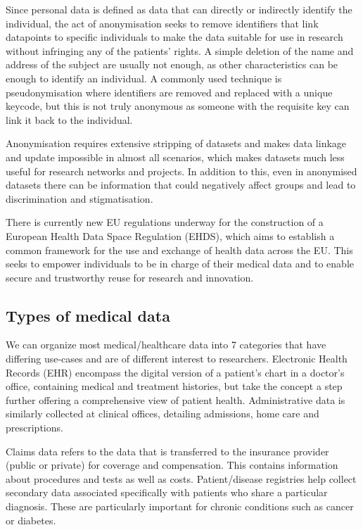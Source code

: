 	Since personal data is defined as data that can directly or indirectly identify the individual\cite{personal}, the act of anonymisation seeks to remove identifiers that link datapoints to specific individuals to make the data suitable for use in research without infringing any of the patients' rights. A simple deletion of the name and address of the subject are usually not enough, as other characteristics can be enough to identify an individual. A commonly used technique is pseudonymisation where identifiers are removed and replaced with a unique keycode, but this is not truly anonymous as someone with the requisite key can link it back to the individual\cite{dataprot}. 
	
	Anonymisation requires extensive stripping of datasets and makes data linkage and update impossible in almost all scenarios, which makes datasets much less useful for research networks and projects. In addition to this, even in anonymised datasets there can be information that could negatively affect groups and lead to discrimination and stigmatisation\cite{mittelstadt2016ethics}.
	
	There is currently new EU regulations underway for the construction of a European Health Data Space Regulation (EHDS), which aims to establish a common framework for the use and exchange of health data across the EU\cite{ehds}. This seeks to empower individuals to be in charge of their medical data and to enable secure and trustworthy reuse for research and innovation.
	
	\subsection{Types of medical data}
	
	We can organize most medical/healthcare data into 7 categories that have differing use-cases and are of different interest to researchers\cite{healthcaredata}. Electronic Health Records (EHR) encompass the digital version of a patient's chart in a doctor's office, containing medical and treatment histories, but take the concept a step further offering a comprehensive view of patient health. Administrative data is similarly collected at clinical offices, detailing admissions, home care and prescriptions.
	
	Claims data refers to the data that is transferred to the insurance provider (public or private) for coverage and compensation. This contains information about procedures and tests as well as costs. Patient/disease registries help collect secondary data associated specifically with patients who share a particular diagnosis. These are particularly important for chronic conditions such as cancer or diabetes.
	
